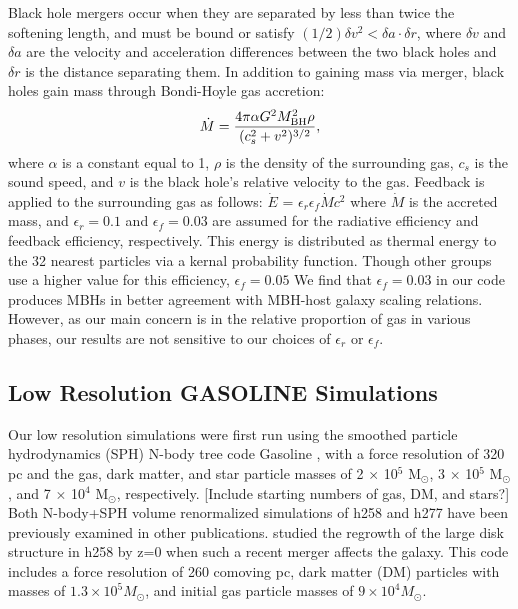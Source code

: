 \documentclass[manuscript]{aastex}
\begin{document}
Black hole mergers occur when they are separated by less than twice the softening length, and must be bound or satisfy $(1/2) \delta v^2 < \delta a \cdot \delta r$,  where $\delta v$ and $\delta a$ are the velocity and acceleration differences between the two black holes and $\delta r$ is the distance separating them. In addition to gaining mass via merger, black holes gain mass through Bondi-Hoyle gas accretion:
\begin{equation}
\dot{M} = \frac{4 \pi \alpha G^2 M^{2}_{\rm BH} \rho}{(c^{2}_{s} + v^2)^{3/2}},
\end{equation}
where $\alpha$ is a constant equal to 1, $\rho$ is the density of the surrounding gas, $c_s$ is the sound speed, and $v$ is the black hole's relative velocity to the gas. Feedback is applied to the surrounding gas as follows: $\dot{E}$ = $\epsilon _{r}$$\epsilon_{f}$$\dot{M}$$c^2$ where $\dot{M}$ is the accreted mass, and $\epsilon _r = 0.1$ and $\epsilon _f = 0.03$ are assumed for the radiative efficiency and feedback efficiency, respectively. This energy is distributed as thermal energy to the 32 nearest particles via a kernal probability function. Though other groups use a higher value for this efficiency, $\epsilon _f = 0.05$ \citep{Sijacki2007,DiMatteo2008} We find that $\epsilon_f = 0.03$ in our code produces MBHs in better agreement with MBH-host galaxy scaling relations. However, as our main concern is in the relative proportion of gas in various phases, our results are not sensitive to our choices of $\epsilon _{r}$ or $\epsilon_{f}$.
 
\subsection{Low Resolution GASOLINE Simulations}

Our low resolution simulations were first run using the smoothed particle hydrodynamics (SPH) N-body tree code Gasoline \citep[][Stadel 2001, how do I cite a thesis?]{Wadsley2004}, with a force resolution of 320 pc and the gas, dark matter, and star particle masses of 2 $\times$ 10$^5$ M$_{\odot}$, 3 $\times$ 10$^5$ M$_{\odot}$, and 7 $\times$ 10$^4$ M$_{\odot}$, respectively.  [Include starting numbers of gas, DM, and stars?] Both N-body+SPH volume renormalized simulations of h258 and h277 have been previously examined in other publications. \cite{Governato2009} studied the regrowth of the large disk structure in h258 by z=0 when such a recent merger affects the galaxy. This code includes a force resolution of 260 comoving pc, dark matter (DM) particles with masses of $1.3 \times 10^5 M_{\odot}$, and initial gas particle masses of $9 \times 10^4 M_{\odot}$.  
\end{document}
